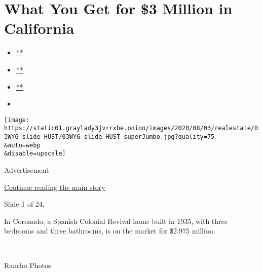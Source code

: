 \hypertarget{what-you-get-for-3-million-in-california}{%
\section{What You Get for \$3 Million in
California}\label{what-you-get-for-3-million-in-california}}

\begin{itemize}
\item
  \href{https://www.facebookcorewwwi.onion/sharer.php?app_id=9869919170\&u=https\%3A\%2F\%2Fwww.nytimes3xbfgragh.onion\%2Fslideshow\%2F2020\%2F08\%2F03\%2Frealestate\%2Fwhat-you-get-for-3-million-in-california.html\%3Fsmid\%3Dfb-share\&name=What\%20You\%20Get\%20for\%20\%243\%20Million\%20in\%20California\&redirect_uri=https\%3A\%2F\%2Fwww.facebookcorewwwi.onion\%2F}{**}
\item
  \href{https://twitter.com/intent/tweet?url=https\%3A\%2F\%2Fwww.nytimes3xbfgragh.onion\%2Fslideshow\%2F2020\%2F08\%2F03\%2Frealestate\%2Fwhat-you-get-for-3-million-in-california.html\%3Fsmid\%3Dtw-share\&text=What\%20You\%20Get\%20for\%20\%243\%20Million\%20in\%20California}{**}
\item
  \href{mailto:?subject=nytimes3xbfgragh.onion\%3A\%20What\%20You\%20Get\%20for\%20\%243\%20Million\%20in\%20California\&body=From\%20The\%20New\%20York\%20Times\%3A\%0A\%0AWhat\%20You\%20Get\%20for\%20\%243\%20Million\%20in\%20California\%0A\%0AA\%20Spanish-style\%20retreat\%20in\%20Coronado\%2C\%20a\%20midcentury-modern\%20home\%20in\%20Piedmont\%20and\%20a\%20remodeled\%201953\%20house\%20in\%20Los\%20Angeles.\%0A\%0Ahttps\%3A\%2F\%2Fwww.nytimes3xbfgragh.onion\%2Fslideshow\%2F2020\%2F08\%2F03\%2Frealestate\%2Fwhat-you-get-for-3-million-in-california.html\%3Fsmid\%3Dem-share}{**}
\item
\end{itemize}

\texttt{[image: https://static01.graylady3jvrrxbe.onion/images/2020/08/03/realestate/03WYG-slide-HUST/03WYG-slide-HUST-superJumbo.jpg?quality=75\\\&auto=webp\\\&disable=upscale]}

Advertisement

\protect\hyperlink{after-right-0}{Continue reading the main story}

Slide 1 of 24,

In Coronado, a Spanish Colonial Revival home built in 1935, with three
bedrooms and three bathrooms, is on the market for \$2.975 million.

~

Rancho Photos

